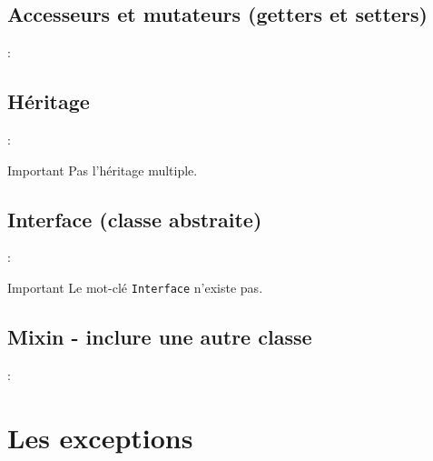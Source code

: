\documentclass[10pt]{beamer}
\begin{document}
\subsection{Accesseurs et mutateurs (getters et setters)}
\begin{frame}[fragile,t]{\secname : \subsecname}
    
\end{frame}

\subsection{Héritage}
\begin{frame}[fragile,t]{\secname : \subsecname}
    \begin{alertblock}{Important}
        Pas l’héritage multiple.
    \end{alertblock}
    
\end{frame}

\subsection{Interface (classe abstraite)}
\begin{frame}[fragile,t]{\secname : \subsecname}
    \begin{alertblock}{Important}
        Le mot-clé \lstinline[language=sql]!Interface! n'existe pas.
    \end{alertblock}
    
\end{frame}

\subsection{Mixin - inclure une autre classe}
\begin{frame}[fragile,t]{\secname : \subsecname}
    
\end{frame}

\section{Les exceptions}
\end{document}

